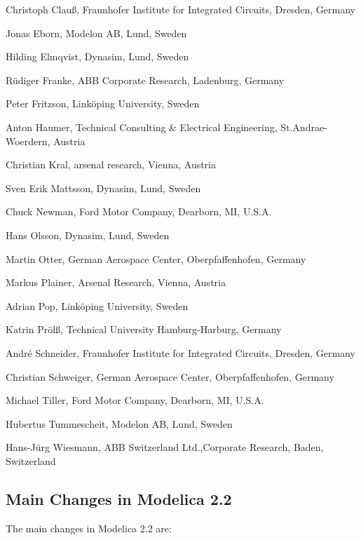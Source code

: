Christoph Clauß, Fraunhofer Institute for Integrated Circuits, Dresden,
Germany

Jonas Eborn, Modelon AB, Lund, Sweden

Hilding Elmqvist, Dynasim, Lund, Sweden

Rüdiger Franke, ABB Corporate Research, Ladenburg, Germany

Peter Fritzson, Linköping University, Sweden

Anton Haumer, Technical Consulting \& Electrical Engineering,
St.Andrae-Woerdern, Austria

Christian Kral, arsenal research, Vienna, Austria

Sven Erik Mattsson, Dynasim, Lund, Sweden

Chuck Newman, Ford Motor Company, Dearborn, MI, U.S.A.

Hans Olsson, Dynasim, Lund, Sweden

Martin Otter, German Aerospace Center, Oberpfaffenhofen, Germany

Markus Plainer, Arsenal Research, Vienna, Austria

Adrian Pop, Linköping University, Sweden

Katrin Prölß, Technical University Hamburg-Harburg, Germany

André Schneider, Fraunhofer Institute for Integrated Circuits, Dresden,
Germany

Christian Schweiger, German Aerospace Center, Oberpfaffenhofen, Germany

Michael Tiller, Ford Motor Company, Dearborn, MI, U.S.A.

Hubertus Tummescheit, Modelon AB, Lund, Sweden

Hans-Jürg Wiesmann, ABB Switzerland Ltd.,Corporate Research, Baden,
Switzerland

\subsection{Main Changes in Modelica 2.2}

The main changes in Modelica 2.2 are:

